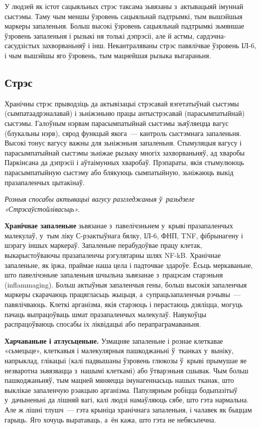 У людзей як істот сацыяльных стрэс таксама зьвязаны з~актывацыяй імуннай сыстэмы. Таму чым меншы ўзровень сацыяльнай падтрымкі, тым вышэйшыя маркеры запаленьня. Больш высокі ўзровень сацыяльнай падтрымкі зьмяншае ўзровень запаленьня і рызыкі ня толькі дэпрэсіі, але й астмы, сардэчна-сасудзістых захворваньняў і інш. Некантраляваны стрэс павялічвае ўзровень ІЛ-6, і чым вышэйшы яго ўзровень, тым мацнейшая рызыка выгараньня.

\subsection*{Стрэс}

Хранічны стрэс прыводзіць да актывізацыі стрэсавай вэгетатыўнай сыстэмы (сымпатаадрэналавай) і зьніжэньню працы антыстрэсавай (парасымпатыйнай) сыстэмы. Галоўным нэрвам парасымпатыйнай сыстэмы зьяўляецца вагус (блукальны нэрв), сярод функцый якога~--- кантроль сыстэмнага запаленьня. Высокі тонус вагусу важны для зьніжэньня запаленьня. Стымуляцыя вагусу і парасымпатыйнай сыстэмы зьніжае рызыку многіх захворваньняў, ад хваробы Паркінсана да дэпрэсіі і аўтаімунных хваробаў. Прэпараты, якія стымулююць парасымпатыйную сыстэму або блякуюць сымпатыйную, зьніжаюць выкід празапаленчых цытакінаў. 

\emph{Розныя спосабы актывацыі вагусу разгледжаныя ў~разьдзеле «Стрэсаўстойлівасьць».}

\textbf{Хранічнае запаленьне} зьвязанае з~павелічэньнем у~крыві празапаленчых малекулаў, у~тым ліку С-рэактыўнага бялку, ІЛ-6, ФНП, TNF, фібрынагену і шэрагу іншых маркераў. Запаленьне перабудоўвае працу клетак, выкарыстоўваючы празапаленчы рэгулятарны шлях NF-kB. Хранічнае запаленьне, як іржа, праймае наша цела і падточвае здароўе. Ёсьць меркаваньне, што павелічэньне запаленьня шчыльна зьвязанае з~працэсам старэньня (inflammaging). Больш актыўныя запаленчыя гены, больш высокія запаленчыя маркеры скарачаюць працягласьць жыцьця, а~супрацьзапаленчыя рэчывы~--- павялічваюць. Клеткі арганізма, якія старэюць і перастаюць дзяліцца, могуць пачаць выпрацоўваць шмат празапаленчых малекулаў. Навукоўцы распрацоўваюць спосабы іх ліквідацыі або перапраграмаваньня.

\textbf{Харчаваньне і атлусьценьне.} Узмацняе запаленьне і рознае клеткавае «сьмецьце», клеткавыя і малекулярныя пашкоджаньні ў~тканках у~выніку, напрыклад, глікацыі (калі падвышаны ўзровень глюкозы ў~крыві прымушае яе незваротна зьвязвацца з~нашымі клеткамі) або ўтварэньня сшывак. Чым больш пашкоджаньняў, тым мацней мяняецца імунагеннасьць нашых тканак, што выклікае запаленчую рэакцыю арганізма. Папулярным робіцца бодыпазітыў у~дачыненьні да лішняй вагі, калі людзі намаўляюць сябе, што гэта нармальна. Але ж лішні тлушч~--- гэта крыніца хранічнага запаленьня, і чалавек як быццам гарыць. Яго хочуць выратаваць, а~ён кажа, што гэта не небясьпечна.

